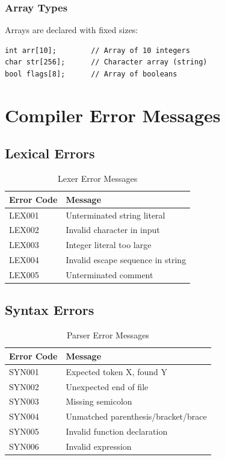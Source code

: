 \documentclass[12pt,a4paper,oneside]{book}
\begin{document}
\subsection{Array Types}

Arrays are declared with fixed sizes:

\begin{verbatim}
int arr[10];        // Array of 10 integers
char str[256];      // Character array (string)
bool flags[8];      // Array of booleans
\end{verbatim}

\chapter{Compiler Error Messages}

\section{Lexical Errors}

\begin{table}[H]
\centering
\caption{Lexer Error Messages}
\begin{tabularx}{\textwidth}{|l|X|}
\hline
\textbf{Error Code} & \textbf{Message} \\
\hline
LEX001 & Unterminated string literal \\
LEX002 & Invalid character in input \\
LEX003 & Integer literal too large \\
LEX004 & Invalid escape sequence in string \\
LEX005 & Unterminated comment \\
\hline
\end{tabularx}
\end{table}

\section{Syntax Errors}

\begin{table}[H]
\centering
\caption{Parser Error Messages}
\begin{tabularx}{\textwidth}{|l|X|}
\hline
\textbf{Error Code} & \textbf{Message} \\
\hline
SYN001 & Expected token X, found Y \\
SYN002 & Unexpected end of file \\
SYN003 & Missing semicolon \\
SYN004 & Unmatched parenthesis/bracket/brace \\
SYN005 & Invalid function declaration \\
SYN006 & Invalid expression \\
\hline
\end{tabularx}
\end{table}
\end{document}
